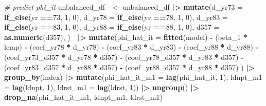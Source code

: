 \documentclass[
]{article}
\newenvironment{Shaded}{\begin{snugshade}}{\end{snugshade}}
\newcommand{\AttributeTok}[1]{\textcolor[rgb]{0.13,0.29,0.53}{#1}}
\newcommand{\CommentTok}[1]{\textcolor[rgb]{0.56,0.35,0.01}{\textit{#1}}}
\newcommand{\DecValTok}[1]{\textcolor[rgb]{0.00,0.00,0.81}{#1}}
\newcommand{\FunctionTok}[1]{\textcolor[rgb]{0.13,0.29,0.53}{\textbf{#1}}}
\newcommand{\NormalTok}[1]{#1}
\newcommand{\OtherTok}[1]{\textcolor[rgb]{0.56,0.35,0.01}{#1}}
\newcommand{\SpecialCharTok}[1]{\textcolor[rgb]{0.81,0.36,0.00}{\textbf{#1}}}
\begin{document}
\begin{Shaded}
\begin{Highlighting}[]
\CommentTok{\# predict phi\_it}
\NormalTok{unbalanced\_df　}\OtherTok{\textless{}{-}}\NormalTok{ unbalanced\_df }\SpecialCharTok{|\textgreater{}}
  \FunctionTok{mutate}\NormalTok{(}\AttributeTok{d\_yr73 =} \FunctionTok{if\_else}\NormalTok{(yr }\SpecialCharTok{==}\DecValTok{73}\NormalTok{, }\DecValTok{1}\NormalTok{, }\DecValTok{0}\NormalTok{),}
         \AttributeTok{d\_yr78 =} \FunctionTok{if\_else}\NormalTok{(yr }\SpecialCharTok{==}\DecValTok{78}\NormalTok{, }\DecValTok{1}\NormalTok{, }\DecValTok{0}\NormalTok{),}
         \AttributeTok{d\_yr83 =} \FunctionTok{if\_else}\NormalTok{(yr }\SpecialCharTok{==}\DecValTok{83}\NormalTok{, }\DecValTok{1}\NormalTok{, }\DecValTok{0}\NormalTok{),}
         \AttributeTok{d\_yr88 =} \FunctionTok{if\_else}\NormalTok{(yr }\SpecialCharTok{==}\DecValTok{88}\NormalTok{, }\DecValTok{1}\NormalTok{, }\DecValTok{0}\NormalTok{),}
         \AttributeTok{d357 =} \FunctionTok{as.numeric}\NormalTok{(d357),}
\NormalTok{        )　}\SpecialCharTok{|\textgreater{}}
  \FunctionTok{mutate}\NormalTok{(}\AttributeTok{phi\_hat\_it =} \FunctionTok{fitted}\NormalTok{(model)}
                  \SpecialCharTok{{-}}\NormalTok{ (beta\_1 }\SpecialCharTok{*}\NormalTok{ lemp)}
                  \SpecialCharTok{{-}}\NormalTok{ (coef\_yr78 }\SpecialCharTok{*}\NormalTok{ d\_yr78)}
                  \SpecialCharTok{{-}}\NormalTok{ (coef\_yr83 }\SpecialCharTok{*}\NormalTok{ d\_yr83)}
                  \SpecialCharTok{{-}}\NormalTok{ (coef\_yr88 }\SpecialCharTok{*}\NormalTok{ d\_yr88)}
                  \SpecialCharTok{{-}}\NormalTok{ (coef\_yr73\_d357 }\SpecialCharTok{*}\NormalTok{ d\_yr78 }\SpecialCharTok{*}\NormalTok{ d357)}
                  \SpecialCharTok{{-}}\NormalTok{ (coef\_yr78\_d357 }\SpecialCharTok{*}\NormalTok{ d\_yr83 }\SpecialCharTok{*}\NormalTok{ d357)}
                  \SpecialCharTok{{-}}\NormalTok{ (coef\_yr83\_d357 }\SpecialCharTok{*}\NormalTok{ d\_yr88 }\SpecialCharTok{*}\NormalTok{ d357)}
                  \SpecialCharTok{{-}}\NormalTok{ (coef\_yr88\_d357 }\SpecialCharTok{*}\NormalTok{ d\_yr88 }\SpecialCharTok{*}\NormalTok{ d357)}
\NormalTok{         ) }\SpecialCharTok{|\textgreater{}}
  \FunctionTok{group\_by}\NormalTok{(index) }\SpecialCharTok{|\textgreater{}}
  \FunctionTok{mutate}\NormalTok{(}\AttributeTok{phi\_hat\_it\_m1 =} \FunctionTok{lag}\NormalTok{(phi\_hat\_it, }\DecValTok{1}\NormalTok{),}
         \AttributeTok{ldnpt\_m1 =} \FunctionTok{lag}\NormalTok{(ldnpt, }\DecValTok{1}\NormalTok{),}
         \AttributeTok{ldrst\_m1 =} \FunctionTok{lag}\NormalTok{(ldrst, }\DecValTok{1}\NormalTok{)) }\SpecialCharTok{|\textgreater{}}
  \FunctionTok{ungroup}\NormalTok{() }\SpecialCharTok{|\textgreater{}}
  \FunctionTok{drop\_na}\NormalTok{(phi\_hat\_it\_m1, ldnpt\_m1, ldrst\_m1)}
\end{Highlighting}
\end{Shaded}
\end{document}
